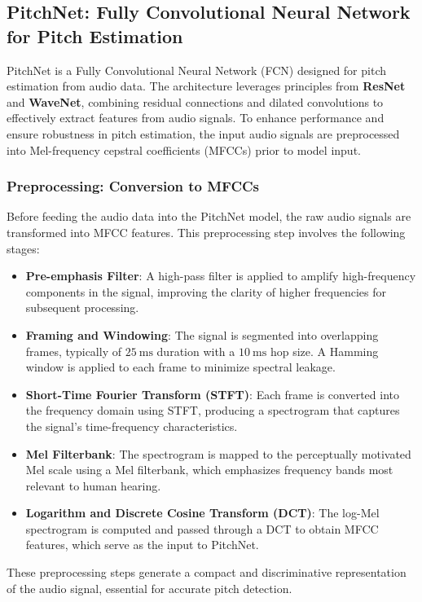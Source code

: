 \documentclass{ieeeaccess}
\begin{document}
\subsection{PitchNet: Fully Convolutional Neural Network for Pitch Estimation}

PitchNet is a Fully Convolutional Neural Network (FCN) designed for pitch estimation from audio data. The architecture leverages principles from \textbf{ResNet} and \textbf{WaveNet}, combining residual connections and dilated convolutions to effectively extract features from audio signals. To enhance performance and ensure robustness in pitch estimation, the input audio signals are preprocessed into Mel-frequency cepstral coefficients (MFCCs) prior to model input.

\subsubsection{Preprocessing: Conversion to MFCCs}
Before feeding the audio data into the PitchNet model, the raw audio signals are transformed into MFCC features. This preprocessing step involves the following stages:

\begin{itemize}
    \item \textbf{Pre-emphasis Filter}: A high-pass filter is applied to amplify high-frequency components in the signal, improving the clarity of higher frequencies for subsequent processing.
    \item \textbf{Framing and Windowing}: The signal is segmented into overlapping frames, typically of \(25\ \text{ms}\) duration with a \(10\ \text{ms}\) hop size. A Hamming window is applied to each frame to minimize spectral leakage.
    \item \textbf{Short-Time Fourier Transform (STFT)}: Each frame is converted into the frequency domain using STFT, producing a spectrogram that captures the signal's time-frequency characteristics.
    \item \textbf{Mel Filterbank}: The spectrogram is mapped to the perceptually motivated Mel scale using a Mel filterbank, which emphasizes frequency bands most relevant to human hearing.
    \item \textbf{Logarithm and Discrete Cosine Transform (DCT)}: The log-Mel spectrogram is computed and passed through a DCT to obtain MFCC features, which serve as the input to PitchNet.
\end{itemize}

These preprocessing steps generate a compact and discriminative representation of the audio signal, essential for accurate pitch detection.
\end{document}
